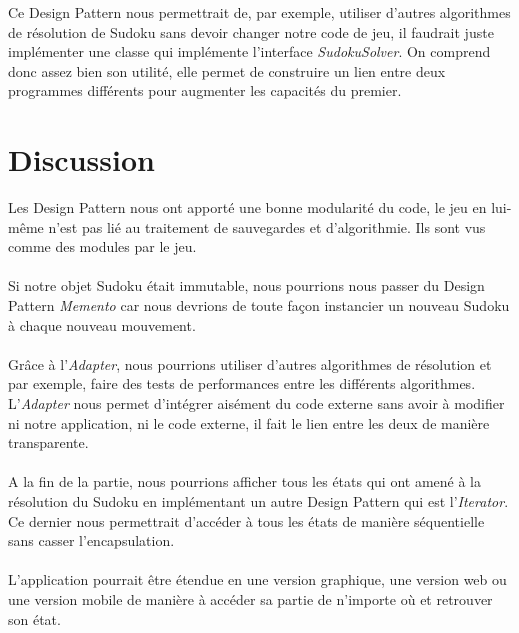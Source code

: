 \documentclass[a4paper]{article}
\begin{document}
Ce Design Pattern nous permettrait de, par exemple, utiliser d'autres algorithmes de résolution de Sudoku sans devoir changer notre code de jeu, il faudrait juste implémenter une classe qui implémente l'interface \textit{SudokuSolver}.
On comprend donc assez bien son utilité, elle permet de construire un lien entre deux programmes différents pour augmenter les capacités du premier.
\newpage

\section{Discussion}
Les Design Pattern nous ont apporté une bonne modularité du code, le jeu en lui-même n'est pas lié au traitement de sauvegardes et d'algorithmie.
Ils sont vus comme des modules par le jeu.\\\\
Si notre objet Sudoku était immutable, nous pourrions nous passer du Design Pattern \textit{Memento} car nous devrions de toute façon instancier un nouveau Sudoku à chaque nouveau mouvement.\\\\
Grâce à l'\textit{Adapter}, nous pourrions utiliser d'autres algorithmes de résolution et par exemple, faire des tests de performances entre les différents algorithmes.
L'\textit{Adapter} nous permet d'intégrer aisément du code externe sans avoir à modifier ni notre application, ni le code externe, il fait le lien entre les deux de manière transparente.\\\\
A la fin de la partie, nous pourrions afficher tous les états qui ont amené à la résolution du Sudoku en implémentant un autre Design Pattern qui est l'\textit{Iterator}.
Ce dernier nous permettrait d'accéder à tous les états de manière séquentielle sans casser l'encapsulation.\\\\
L'application pourrait être étendue en une version graphique, une version web ou une version mobile de manière à accéder sa partie de n'importe où et retrouver son état.
\end{document}
